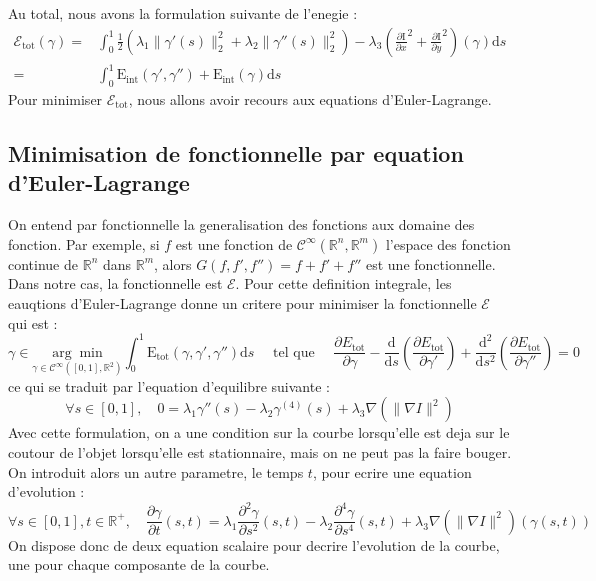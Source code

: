 \documentclass[10pt,a4paper]{article}
\begin{document}
Au total, nous avons la formulation suivante de l'enegie : 
\begin{align*}
	\mathcal{E}_{\text{tot}}(\gamma) =& \int_{0}^{1} \frac{1}{2} \left(\lambda_1 \|\gamma'(s) \|_{2}^{2} + \lambda_2 \|\gamma''(s) \|_{2}^{2}\right)  - \lambda_3    \left( \frac{\partial \text{I}}{\partial x}^{2} + \frac{\partial \text{I}}{\partial y}^{2} \right)(\gamma) \mathrm{d}s\\
	= & \int_{0}^{1} \text{E}_{\text{int}}(\gamma',\gamma'') + \text{E}_{\text{int}}(\gamma) \mathrm{d}s
\end{align*}
Pour minimiser $\mathcal{E}_{\text{tot}}$, nous allons avoir recours aux equations d'Euler-Lagrange.



\subsection{Minimisation de fonctionnelle par equation d'Euler-Lagrange}
On entend par fonctionnelle la generalisation des fonctions aux domaine des fonction. Par exemple, si $f$ est une fonction de $\mathcal{C}^\infty(\mathbb{R}^n,\mathbb{R}^m)$ l'espace des fonction continue de $\mathbb{R}^n$ dans $\mathbb{R}^m$, alors $G(f,f',f'')=f+f'+f''$ est une fonctionnelle. Dans notre cas, la fonctionnelle est $\mathcal{E}$. Pour cette definition integrale, les eauqtions d'Euler-Lagrange donne un critere pour minimiser la fonctionnelle $\mathcal{E}$ qui est :
\begin{displaymath}
	\gamma\in\underset{\gamma\in\mathcal{C}^{\infty}([0,1],\mathbb{R}^2)}{\arg\min}\int_{0}^{1} \text{E}_{\text{tot}}(\gamma,\gamma',\gamma'')  \mathrm{d}s \quad\text{    tel que     }\quad \frac{\partial E_{\text{tot}}}{\partial \gamma} -\frac{\mathrm{d}}{\mathrm{d}s}\left(\frac{\partial E_{\text{tot}}}{\partial \gamma'}\right) + \frac{\mathrm{d}^2}{\mathrm{d}s^2}\left(\frac{\partial E_{\text{tot}}}{\partial \gamma''}\right) = 0
\end{displaymath}
ce qui se traduit par l'equation d'equilibre suivante : 
\begin{displaymath}
	\forall s\in[0,1],\quad 0 = \lambda_1 \gamma''(s) - \lambda_2 \gamma^{(4)}(s) + \lambda_3 \nabla(\|\nabla I\|^2)
\end{displaymath}
Avec cette formulation, on a une condition sur la courbe lorsqu'elle est deja sur le coutour de l'objet lorsqu'elle est stationnaire, mais on ne peut pas la faire bouger. On introduit alors un autre parametre, le temps $t$, pour ecrire une equation d'evolution : 
\begin{equation}\label{temporelContinu}
	\forall s\in[0,1], t\in\mathbb{R}^{+},\quad \frac{\partial \gamma}{\partial t}(s,t) = \lambda_1 \frac{\partial^2 \gamma}{\partial s^2}(s,t) - \lambda_2 \frac{\partial^4 \gamma}{\partial s^4}(s,t) + \lambda_3 \nabla(\|\nabla I\|^2)(\gamma(s,t))
\end{equation}
On dispose donc de deux equation scalaire pour decrire l'evolution de la courbe, une pour chaque composante de la courbe.
\end{document}
